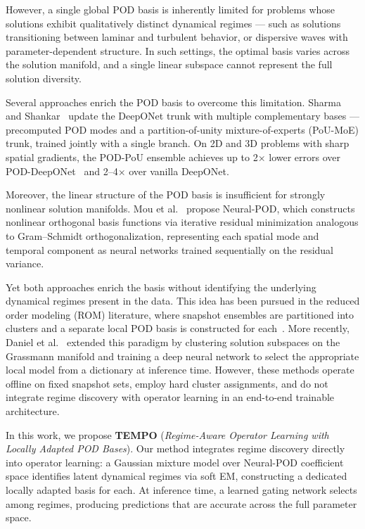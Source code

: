 \documentclass{article}
\begin{document}
However, a single global POD basis is inherently limited for problems whose solutions exhibit qualitatively distinct dynamical regimes — such as solutions transitioning between laminar and turbulent behavior, or dispersive waves with parameter-dependent structure. In such settings, the optimal basis varies across the solution manifold, and a single linear subspace cannot represent the full solution diversity.

Several approaches enrich the POD basis to overcome this limitation. Sharma and Shankar~\cite{Sharma2025} update the DeepONet trunk with multiple complementary bases — precomputed POD modes and a partition-of-unity mixture-of-experts (PoU-MoE) trunk, trained jointly with a single branch. On 2D and 3D problems with sharp spatial gradients, the POD-PoU ensemble achieves up to 2$\times$ lower errors over POD-DeepONet~\cite{Lu2022} and 2--4$\times$ over vanilla DeepONet.


Moreover, the linear structure of the POD basis is insufficient for strongly nonlinear solution manifolds. Mou et al.~\cite{Mou2026} propose Neural-POD, which constructs nonlinear orthogonal basis functions via iterative residual minimization analogous to Gram--Schmidt orthogonalization, representing each  spatial mode and temporal component as neural networks trained sequentially on the residual variance.


Yet both approaches enrich the basis without identifying the underlying dynamical regimes present in the data. This idea has been pursued in the reduced order modeling (ROM) literature, where snapshot ensembles are partitioned into clusters and a separate local POD basis is constructed for each~\cite{Amsallem2012, Hess2019}. More recently, Daniel et al.~\cite{Daniel2020} extended this paradigm by clustering solution subspaces on the Grassmann manifold and training a deep neural network to select the appropriate local model from a dictionary at inference time. However, these methods operate offline on fixed snapshot sets, employ hard cluster assignments, and do not integrate regime discovery with operator learning in an end-to-end trainable architecture.

In this work, we propose \textbf{TEMPO} (\textit{Regime-Aware Operator Learning with Locally Adapted POD Bases}). Our method integrates regime discovery directly into operator learning: a Gaussian mixture model over Neural-POD coefficient space identifies latent dynamical regimes via soft EM, constructing a dedicated locally adapted basis for each. At inference time, a learned gating network selects among regimes, producing predictions that are accurate across the full parameter space.
\end{document}
